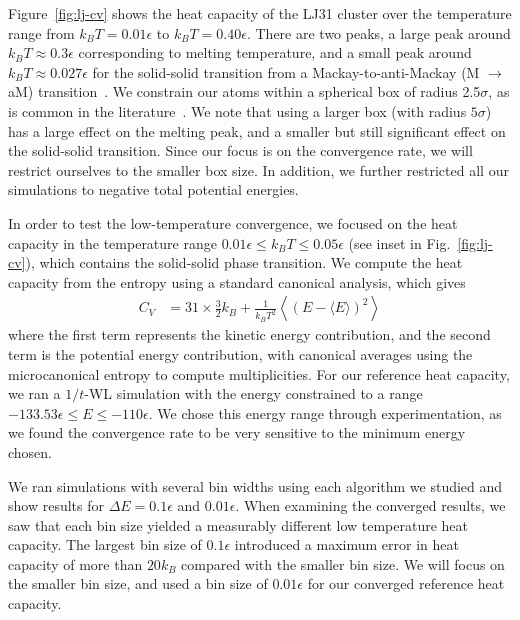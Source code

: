 \documentclass[letterpaper,twocolumn,amsmath,amssymb,pre,aps,10pt]{revtex4-1}
\begin{document}
Figure~\ref{fig:lj-cv} shows the heat capacity of the LJ31 cluster
over the temperature range from $k_BT=0.01\epsilon$ to
$k_BT=0.40\epsilon$.  There are two peaks, a large peak around $k_BT
\approx 0.3\epsilon$ corresponding to melting temperature, and a
small peak around $k_BT \approx 0.027\epsilon$ for the solid-solid
transition from a Mackay-to-anti-Mackay (M $\rightarrow$ aM)
transition~\cite{doye1997thermally, hendy2001molecular,
  mandelshtam2006multiple}.  We constrain our atoms within a spherical
box of radius 2.5$\sigma$, as is common in the
literature~\cite{poulain2006performances, mandelshtam2006multiple}.
We note that using a larger box (with radius $5\sigma$) has a large
effect on the melting peak, and a smaller but still significant effect
on the solid-solid transition.  Since our focus is on the convergence
rate, we will restrict ourselves to the smaller box size.  In addition, we
further restricted all our simulations to negative total potential energies.

In order to test the low-temperature convergence, we focused on the
heat capacity in the temperature range $0.01\epsilon \le k_BT \le
0.05\epsilon$ (see inset in Fig.~\ref{fig:lj-cv}), which contains
the solid-solid phase transition.
%
We compute the heat capacity from the entropy using a standard
canonical analysis, which gives
\begin{align}
  C_V &= 31\times\frac32k_B + \frac1{k_BT^2}\left< (E- \langle
  E\rangle)^2\right>
  \label{eq:cv}
\end{align}
where the first term represents the kinetic energy contribution, and
the second term is the potential energy contribution, with canonical
averages using the microcanonical entropy to compute multiplicities.
%
For our reference heat capacity, we ran a $1/t$-WL simulation with the
energy constrained to a range $-133.53\epsilon\le E\le -110\epsilon$.
We chose this energy range through experimentation, as we found the
convergence rate to be very sensitive to the minimum energy chosen.

We ran simulations with several bin widths using each algorithm we studied
and show results for $\Delta E=0.1\epsilon$ and
$0.01\epsilon$.
When examining the converged results, we saw that each bin size yielded a
measurably different low temperature heat capacity. The largest
bin size of $0.1\epsilon$ introduced a maximum error in heat capacity
of more than $20k_B$ compared with the smaller bin size.  We will focus on
the smaller bin size, and
used a bin size of $0.01\epsilon$ for our converged reference heat capacity.
\end{document}

